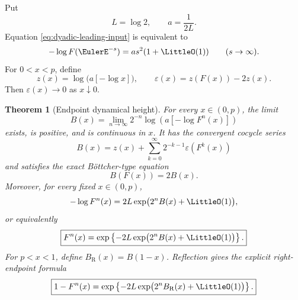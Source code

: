 \documentclass[11pt,oneside]{article}
\newtheorem{theorem}{Theorem}[section]
\theoremstyle{definition}
\theoremstyle{remark}
\begin{document}
Put
\begin{equation}
 L=\log2,
 \qquad a=\frac1{2L}.
 \label{eq:a-endpoint}
\end{equation}
Equation \eqref{eq:dyadic-leading-input} is equivalent to
\begin{equation}
 -\log F(\EulerE^{-s})=a s^2(1+\LittleO(1))
 \qquad(s\to\infty).
 \label{eq:endpoint-s-law}
\end{equation}
For \(0<x<p\), define
\begin{equation}
 z(x)=\log\bigl(a[-\log x]\bigr),
 \qquad
 \varepsilon(x)=z(F(x))-2z(x).
 \label{eq:z-epsilon}
\end{equation}
Then \(\varepsilon(x)\to0\) as \(x\downarrow0\).

\begin{theorem}[Endpoint dynamical height]
\label{thm:endpoint-height}
For every \(x\in(0,p)\), the limit
\begin{equation}
 \boxed{\displaystyle
 B(x)=\lim_{n\to\infty}2^{-n}
 \log\left(a[-\log F^n(x)]\right)}
 \label{eq:B-limit}
\end{equation}
exists, is positive, and is continuous in \(x\).  It has the convergent cocycle series
\begin{equation}
 B(x)=z(x)+\sum_{k=0}^{\infty}2^{-k-1}\varepsilon(F^k(x))
 \label{eq:B-series}
\end{equation}
and satisfies the exact B\"ottcher-type equation
\begin{equation}
 B(F(x))=2B(x).
 \label{eq:B-doubling}
\end{equation}
Moreover, for every fixed \(x\in(0,p)\),
\begin{equation}
 -\log F^n(x)
 =2L\exp\bigl(2^nB(x)+\LittleO(1)\bigr),
 \label{eq:double-exp-log}
\end{equation}
or equivalently
\begin{equation}
 \boxed{\displaystyle
 F^n(x)=
 \exp\left\{-2L\exp\bigl(2^nB(x)+\LittleO(1)\bigr)\right\}.}
 \label{eq:double-exponential-orbit}
\end{equation}
For \(p<x<1\), define \(B_{\mathrm R}(x)=B(1-x)\).  Reflection gives the explicit
right-endpoint formula
\begin{equation}
 \boxed{\displaystyle
 1-F^n(x)=
 \exp\left\{-2L\exp\bigl(2^nB_{\mathrm R}(x)+\LittleO(1)\bigr)\right\}.}
 \label{eq:double-exponential-right-orbit}
\end{equation}
\end{theorem}
\end{document}
